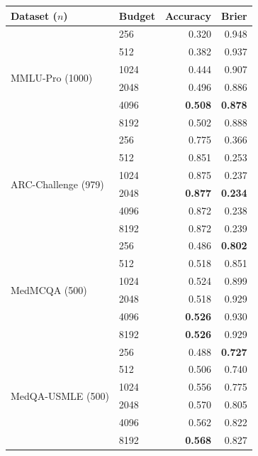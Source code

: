 \documentclass[a4paper,fleqn]{cas-sc}
\theoremstyle{plain}
\theoremstyle{definition}
\theoremstyle{remark}
\begin{document}
\begin{center}
\begin{tabular}{@{}llrr@{}}
\toprule
Dataset ($n$) & Budget & Accuracy & Brier \\
\midrule
\multirow{6}{*}{MMLU-Pro (1000)}
 & 256  & 0.320 & 0.948 \\
 & 512  & 0.382 & 0.937 \\
 & 1024 & 0.444 & 0.907 \\
 & 2048 & 0.496 & 0.886 \\
 & 4096 & \textbf{0.508} & \textbf{0.878} \\
 & 8192 & 0.502 & 0.888 \\
\midrule
\multirow{6}{*}{ARC-Challenge (979)}
 & 256  & 0.775 & 0.366 \\
 & 512  & 0.851 & 0.253 \\
 & 1024 & 0.875 & 0.237 \\
 & 2048 & \textbf{0.877} & \textbf{0.234} \\
 & 4096 & 0.872 & 0.238 \\
 & 8192 & 0.872 & 0.239 \\
\midrule
\multirow{6}{*}{MedMCQA (500)}
 & 256  & 0.486 & \textbf{0.802} \\
 & 512  & 0.518 & 0.851 \\
 & 1024 & 0.524 & 0.899 \\
 & 2048 & 0.518 & 0.929 \\
 & 4096 & \textbf{0.526} & 0.930 \\
 & 8192 & \textbf{0.526} & 0.929 \\
\midrule
\multirow{6}{*}{MedQA-USMLE (500)}
 & 256  & 0.488 & \textbf{0.727} \\
 & 512  & 0.506 & 0.740 \\
 & 1024 & 0.556 & 0.775 \\
 & 2048 & 0.570 & 0.805 \\
 & 4096 & 0.562 & 0.822 \\
 & 8192 & \textbf{0.568} & 0.827 \\
\bottomrule
\end{tabular}
\end{center}
\begingroup
{}
\label{tab:budget-audit-m2}
\endgroup
\vspace{\baselineskip}
\end{document}

